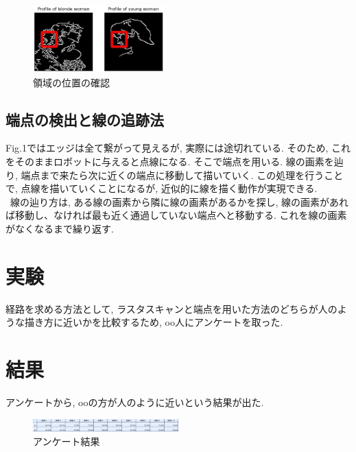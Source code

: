 \documentclass[10pt]{jarticle}
\begin{document}
    \begin{center}
        \begin{figure}[h]
            \includegraphics[width=0.45\textwidth]{img/003.png}
            \caption{領域の位置の確認}
            \label{the position of a region}
        \end{figure}
    \end{center}
	

	\subsection{端点の検出と線の追跡法}
	Fig.1ではエッジは全て繋がって見えるが, 実際には途切れている. そのため, これをそのままロボットに与えると点線になる.
	そこで端点を用いる.
	線の画素を辿り, 端点まで来たら次に近くの端点に移動して描いていく.
	この処理を行うことで, 点線を描いていくことになるが, 近似的に線を描く動作が実現できる.
  \\\  
	線の辿り方は, ある線の画素から隣に線の画素があるかを探し, 線の画素があれば移動し、なければ最も近く通過していない端点へと移動する.
	これを線の画素がなくなるまで繰り返す.
	


	\section{実験}

	経路を求める方法として, ラスタスキャンと端点を用いた方法のどちらが人のような描き方に近いかを比較するため, oo人にアンケートを取った.

	\section{結果}
	
	アンケートから, ooの方が人のように近いという結果が出た.

    \begin{center}
        \begin{figure}[h]
            \includegraphics[width=0.5\textwidth]{img/006.png}
            \caption{アンケート結果}
            \label{manipulator}
        \end{figure}
    \end{center}
\end{document}
